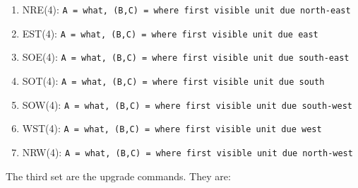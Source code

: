 \documentclass{article}
\begin{document}
\begin{enumerate}[noitemsep]
    \item NRE(4): \texttt{A = what, (B,C) = where first visible unit due
        north-east}
    \item EST(4): \texttt{A = what, (B,C) = where first visible unit due east}
    \item SOE(4): \texttt{A = what, (B,C) = where first visible unit due
        south-east}
    \item SOT(4): \texttt{A = what, (B,C) = where first visible unit due south}
    \item SOW(4): \texttt{A = what, (B,C) = where first visible unit due
        south-west}
    \item WST(4): \texttt{A = what, (B,C) = where first visible unit due west}
    \item NRW(4): \texttt{A = what, (B,C) = where first visible unit due
        north-west}
\end{enumerate}

The third set are the upgrade commands. They are:
\end{document}
